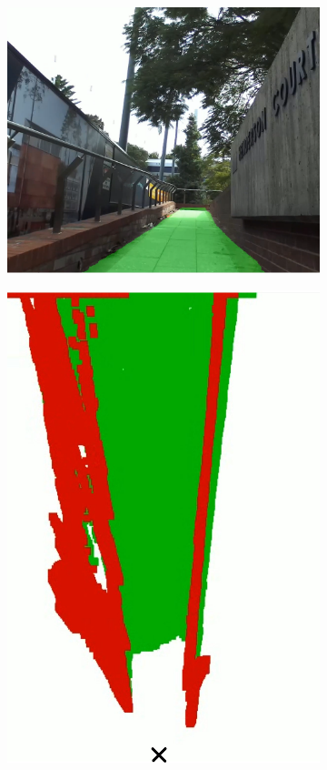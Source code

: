 \documentclass[10pt,twoside]{article}
\begin{document}
\begin{figure}[H]
    \centering
    \begin{subfigure}{.35\textwidth}
        \centering
        \includegraphics[width=\linewidth]{images/segmentation.PNG}
    \end{subfigure}
    \quad
    \begin{subfigure}{.2\textwidth}
        \centering
        \includegraphics[width=\linewidth,frame]{images/map.jpg}

\end{subfigure}
\end{figure}
\end{document}
